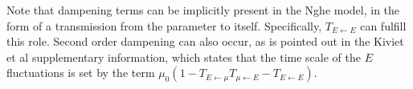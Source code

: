 Note that dampening terms can be implicitly present in the Nghe model, in the form of a transmission from the parameter to itself.
Specifically, $T_{E \leftarrow E}$ can fulfill this role. %
Second order dampening can also occur, 
as is pointed out in the Kiviet et al supplementary information, which states that the time scale of the $E$ fluctuations is set by the term $\mu_0(1-T_{E \leftarrow \mu}T_{\mu \leftarrow E}-T_{E \leftarrow E})$.






